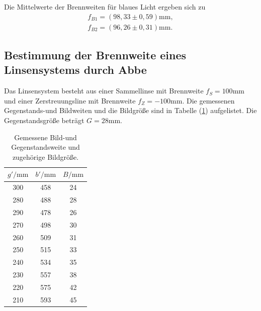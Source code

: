 Die Mittelwerte der Brennweiten für blaues Licht ergeben sich zu
\begin{align*}
f_{B1} = (98,33 \pm 0,59) \si{\milli\meter}, \\
f_{B2} = (96,26 \pm 0,31) \si{\milli\meter} .
\end{align*}

\subsection{Bestimmung der Brennweite eines Linsensystems durch Abbe}
Das Linsensystem besteht aus einer Sammellinse mit Brennweite $f_S = 100 \si{\milli\meter}$ und einer Zerstreuungsline mit Brennweite $f_Z = - 100 \si{\milli\meter}$.
Die gemessenen Gegenstands-und Bildweiten und die Bildgröße sind in Tabelle (\ref{tab:einzel8}) aufgelistet. Die Gegenstandsgröße beträgt $G = 28 \si{\milli\meter}$.

\begin{table}[H]
\centering
\caption{Gemessene Bild-und Gegenstandsweite und zugehörige Bildgröße.}
\label{tab:einzel8}
\begin{tabular}{c c c}
\toprule
$g'/\si{\milli\meter}$ & $b'/\si{\milli\meter}$ & $B/\si{\milli\meter}$\\
\midrule
300&	458&	24\\
280&	488&	28\\
290&	478&	26\\
270&	498&	30\\
260&	509&	31\\
250&	515&	33\\
240&	534&	35\\
230&	557&	38\\
220&	575&	42\\
210&	593&	45\\
\bottomrule
\end{tabular}
\end{table}

